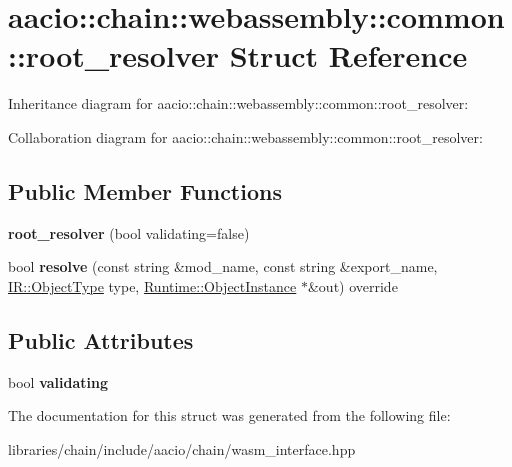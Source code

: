 \hypertarget{structaacio_1_1chain_1_1webassembly_1_1common_1_1root__resolver}{}\section{aacio\+:\+:chain\+:\+:webassembly\+:\+:common\+:\+:root\+\_\+resolver Struct Reference}
\label{structaacio_1_1chain_1_1webassembly_1_1common_1_1root__resolver}


Inheritance diagram for aacio\+:\+:chain\+:\+:webassembly\+:\+:common\+:\+:root\+\_\+resolver\+:


Collaboration diagram for aacio\+:\+:chain\+:\+:webassembly\+:\+:common\+:\+:root\+\_\+resolver\+:
\subsection*{Public Member Functions}
\begin{DoxyCompactItemize}
\item 
\mbox{\label{structaacio_1_1chain_1_1webassembly_1_1common_1_1root__resolver_a8dcc35e87706f7e1fc25e82408f0b57c}} 
{\bfseries root\+\_\+resolver} (bool validating=false)
\item 
\mbox{\label{structaacio_1_1chain_1_1webassembly_1_1common_1_1root__resolver_ac6e902d78293a56e8e960e89a7ee0a7d}} 
bool {\bfseries resolve} (const string \&mod\+\_\+name, const string \&export\+\_\+name, \mbox{\hyperlink{struct_i_r_1_1_object_type}{I\+R\+::\+Object\+Type}} type, \mbox{\hyperlink{struct_runtime_1_1_object_instance}{Runtime\+::\+Object\+Instance}} $\ast$\&out) override
\end{DoxyCompactItemize}
\subsection*{Public Attributes}
\begin{DoxyCompactItemize}
\item 
\mbox{\label{structaacio_1_1chain_1_1webassembly_1_1common_1_1root__resolver_a5e514b203bc14291005ddc1e208ab2e6}} 
bool {\bfseries validating}
\end{DoxyCompactItemize}


The documentation for this struct was generated from the following file\+:\begin{DoxyCompactItemize}
\item 
libraries/chain/include/aacio/chain/wasm\+\_\+interface.\+hpp\end{DoxyCompactItemize}

